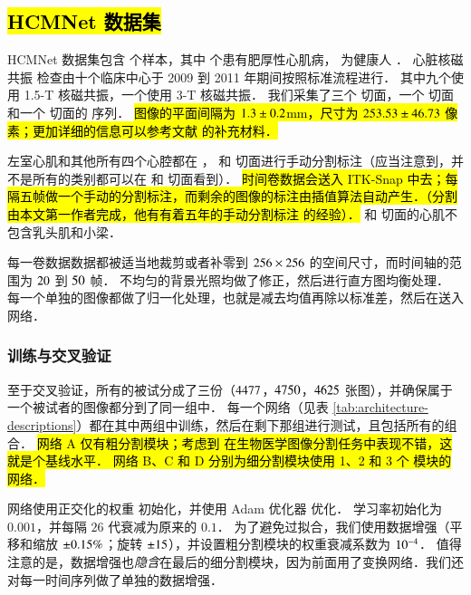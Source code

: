 
\subsection{\hl{HCMNet 数据集}}



HCMNet 数据集包含 \NumPtT{} 个样本，其中 \NumPtO{} 个患有肥厚性心肌病，\NumPtC{} 为健康人 \citep{Ho2017}．
心脏核磁共振 \CMR{} 检查由十个临床中心于 2009 到 2011 年期间按照标准流程进行．
其中九个使用 1.5-T 核磁共振，一个使用 3-T 核磁共振．
我们采集了三个 \SA{} 切面，一个 \HLA{} 切面和一个 \VLA{} 切面的 \SSFP{} 序列．
\hl{
图像的平面间隔为 $1.3{} \pm 0.2{}$mm，尺寸为 $253.53{} \pm 46.73{}$ 像素；更加详细的信息可以参考文献 \citet{Ho2017} 的补充材料．
}

左室心肌和其他所有四个心腔都在 \SA{}，\HLA{} 和 \VLA{} 切面进行手动分割标注（应当注意到，并不是所有的类别都可以在 \SA{} 和 \VLA{} 切面看到）．
\hl{
 时间卷数据会送入 ITK-Snap \citep{Yushkevich2006} 中去；每隔五帧做一个手动的分割标注，而剩余的图像的标注由插值算法自动产生．（分割由本文第一作者完成，他有有着五年的手动分割标注 \CMR{} 的经验）．
}
\LV{} 和 \RV{} 切面的心肌不包含乳头肌和小梁．

每一卷数据数据都被适当地裁剪或者补零到 $256 \times 256$ 的空间尺寸，而时间轴的范围为 $20{}$ 到 $50{}$ 帧．
不均匀的背景光照均做了修正，然后进行直方图均衡处理．
每一个单独的图像都做了归一化处理，也就是减去均值再除以标准差，然后在送入 \CNN{} 网络．

\subsubsection{训练与交叉验证}

至于交叉验证，所有的被试分成了三份（$4477{}$，$4750{}$，$4625{}$ 张图），并确保属于一个被试者的图像都分到了同一组中．
每一个网络（见表 \ref{tab:architecture-descriptions}）都在其中两组中训练，然后在剩下那组进行测试，且包括所有的组合．
\hl{
网络 A 仅有粗分割模块；考虑到 \UNet{} 在生物医学图像分割任务中表现不错，这就是个基线水平．
网络 B、C 和 D 分别为细分割模块使用 1、2 和 3 个 \UNet{} 模块的 \omeganet{} 网络．
}

网络使用正交化的权重 \hl{\citep{Saxe2013}} 初始化，并使用 Adam 优化器 \citep{Kingma2015} 优化．
学习率初始化为 $0.001$，并每隔 $26$ 代衰减为原来的 $0.1$．
为了避免过拟合，我们使用数据增强（平移和缩放 $\pm 0.15{}\%$；旋转 $\pm \AugRot{}$\degree），并设置粗分割模块的权重衰减系数为 $10^{-4}{}$．
值得注意的是，数据增强也\emph{隐含}在最后的细分割模块，因为前面用了变换网络．我们还对每一时间序列做了单独的数据增强．


